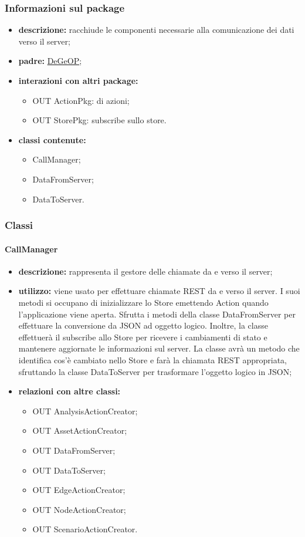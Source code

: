 \subsubsection{Informazioni sul package}
\begin{itemize}
	\item \textbf{descrizione:} racchiude le componenti necessarie alla comunicazione dei dati verso il server;
	\item \textbf{padre:} \hyperref[pkg::DeGeOP]{DeGeOP};
	\item \textbf{interazioni con altri package:} 
	\begin{itemize}
		\item OUT ActionPkg:  di azioni;
		\item OUT StorePkg: subscribe sullo store.
	\end{itemize}
	\item \textbf{classi contenute:}
	\begin{itemize}
		\item CallManager;
		\item DataFromServer;
		\item DataToServer.
	\end{itemize}
\end{itemize}
\subsubsection{Classi}
\paragraph{CallManager}
\begin{itemize}
	\item \textbf{descrizione:} rappresenta il gestore delle chiamate da e verso il server;
	\item \textbf{utilizzo:} viene usato per effettuare chiamate REST da e verso il server. I suoi metodi si occupano di inizializzare lo Store emettendo Action quando l'applicazione viene aperta. Sfrutta i metodi della classe DataFromServer per effettuare la conversione da JSON ad oggetto logico. Inoltre, la classe effettuerà il subscribe allo Store per ricevere i cambiamenti di stato e mantenere aggiornate le informazioni sul server. La classe avrà un metodo che identifica cos'è cambiato nello Store e farà la chiamata REST appropriata, sfruttando la classe DataToServer per trasformare l'oggetto logico in JSON;
	\item \textbf{relazioni con altre classi:} 
	\begin{itemize}
		\item OUT AnalysisActionCreator;
		\item OUT AssetActionCreator;
		\item OUT DataFromServer;
		\item OUT DataToServer;
		\item OUT EdgeActionCreator;
		\item OUT NodeActionCreator;
		\item OUT ScenarioActionCreator.
	\end{itemize}
\end{itemize}
